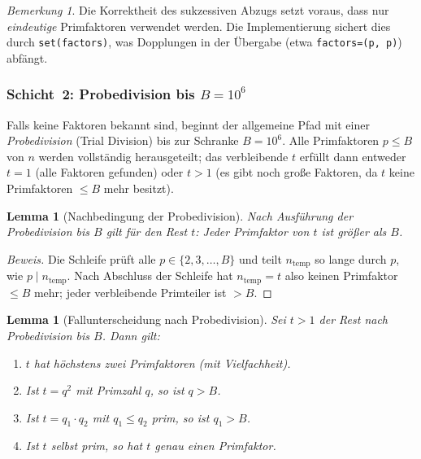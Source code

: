﻿\documentclass[12pt, a4paper]{article}
\theoremstyle{plain}
\newtheorem{lemma}[theorem]{Lemma}
\theoremstyle{definition}
\theoremstyle{remark}
\newtheorem{remark}[theorem]{Bemerkung}
\newenvironment{myproof}[1][Beweis]{%
  \begin{proof}[#1]
}{%
  \end{proof}
}
\begin{document}
\begin{remark}
  Die Korrektheit des sukzessiven Abzugs setzt voraus, dass nur
  \emph{eindeutige} Primfaktoren verwendet werden. Die Implementierung
  sichert dies durch \texttt{set(factors)}, was Dopplungen in der
  \"Ubergabe (etwa \texttt{factors=(p, p)}) abf\"angt.
\end{remark}

\subsubsection{Schicht~2: Probedivision bis $B = 10^6$}

Falls keine Faktoren bekannt sind, beginnt der allgemeine Pfad mit
einer \emph{Probedivision} (Trial Division) bis zur Schranke
$B = 10^6$. Alle Primfaktoren $p \le B$ von $n$ werden vollst\"andig
herausgeteilt; das verbleibende $t$ erf\"ullt dann entweder $t = 1$
(alle Faktoren gefunden) oder $t > 1$ (es gibt noch gro{\ss}e Faktoren,
da $t$ keine Primfaktoren $\le B$ mehr besitzt).

\begin{lemma}[Nachbedingung der Probedivision]\label{lem:trial_div_post}
  Nach Ausf\"uhrung der Probedivision bis $B$ gilt f\"ur den Rest $t$:
  Jeder Primfaktor von $t$ ist gr\"o{\ss}er als $B$.
\end{lemma}

\begin{myproof}
  Die Schleife pr\"uft alle $p \in \{2, 3, \ldots, B\}$ und teilt
  $n_{\mathrm{temp}}$ so lange durch $p$, wie $p \mid n_{\mathrm{temp}}$.
  Nach Abschluss der Schleife hat $n_{\mathrm{temp}} = t$ also keinen
  Primfaktor $\le B$ mehr; jeder verbleibende Primteiler ist $> B$.
\end{myproof}

\begin{lemma}[Fallunterscheidung nach Probedivision]\label{lem:fallunterscheidung}
  Sei $t > 1$ der Rest nach Probedivision bis $B$. Dann gilt:
  \begin{enumerate}[label=(\roman*)]
    \item $t$ hat h\"ochstens zwei Primfaktoren (mit Vielfachheit).
    \item Ist $t = q^2$ mit Primzahl $q$, so ist $q > B$.
    \item Ist $t = q_1 \cdot q_2$ mit $q_1 \le q_2$ prim, so ist $q_1 > B$.
    \item Ist $t$ selbst prim, so hat $t$ genau einen Primfaktor.
  \end{enumerate}
\end{lemma}
\end{document}
